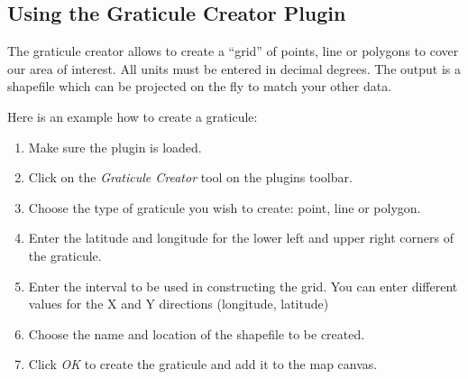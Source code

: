 \subsection{Using the Graticule Creator Plugin}

The graticule creator allows to create a ``grid'' of points, line or
polygons to cover our area of interest. All units must be entered in
decimal degrees. The output is a shapefile which can be projected on the
fly to match your other data.


Here is an example how to create a graticule:

\begin{enumerate}
\item Make sure the plugin is loaded.
\item Click on the \textsl{Graticule Creator} tool on the plugins toolbar.
\item Choose the type of graticule you wish to create: point, line or
  polygon.
\item Enter the latitude and longitude for the lower left and upper right
  corners of the graticule.
\item Enter the interval to be used in constructing the grid. You can
  enter different values for the X and Y directions (longitude, latitude)
\item Choose the name and location of the shapefile to be created.
\item Click \textsl{OK} to create the graticule and add it to the map
  canvas.
\end{enumerate} 


